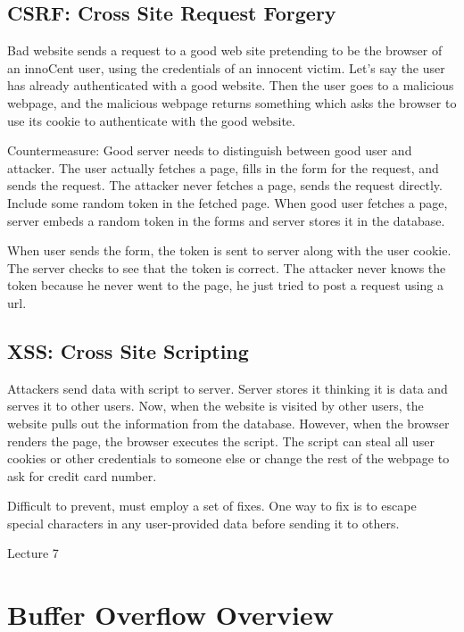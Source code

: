 \documentclass[psamsfonts]{amsart}
\begin{document}
\subsection{CSRF: Cross Site Request Forgery}

Bad website sends a request to a good web site pretending to be the browser of an innoCent user, using the credentials of an innocent victim. Let's say the user has already authenticated with a good website. Then the user goes to a malicious webpage, and the malicious webpage returns something which asks the browser to use its cookie to authenticate with the good website.

Countermeasure: Good server needs to distinguish between good user and attacker. The user actually fetches a page, fills in the form for the request, and sends the request. The attacker never fetches a page, sends the request directly. Include some random token in the fetched page. When good user fetches a page, server embeds a random token in the forms and server stores it in the database.

When user sends the form, the token is sent to server along with the user cookie. The server checks to see that the token is correct. The attacker never knows the token because he never went to the page, he just tried to post a request using a url.

\subsection{XSS: Cross Site Scripting}

Attackers send data with script to server. Server stores it thinking it is data and serves it to other users. Now, when the website is visited by other users, the website pulls out the information from the database. However, when the browser renders the page, the browser executes the script. The script can steal all user cookies or other credentials to someone else or change the rest of the webpage to ask for credit card number.

Difficult to prevent, must employ a set of fixes. One way to fix is to escape special characters in any user-provided data before sending it to others.


\newpage
\Large{Lecture 7}


\maketitle

\section{Buffer Overflow Overview}
\end{document}
